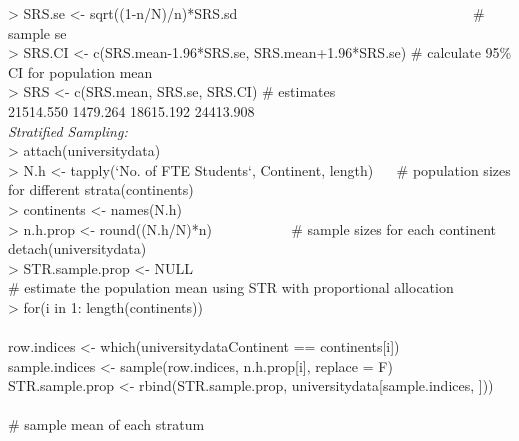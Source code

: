\documentclass{article}
\begin{document}
\textgreater\hspace{1mm} SRS.se \textless- sqrt((1-n/N)/n)*SRS.sd ~~~~~~~~~~~~~~~~~~~~~~~~~~~~~~~~~\# sample se\\
\textgreater\hspace{1mm} SRS.CI \textless- c(SRS.mean-1.96*SRS.se, SRS.mean+1.96*SRS.se) \# calculate 95\% CI for population mean\\
\textgreater\hspace{1mm} SRS \textless- c(SRS.mean, SRS.se, SRS.CI) \# estimates\\
\hspace{1mm} 21514.550  1479.264 18615.192 24413.908\\

\noindent\textit{Stratified Sampling:}\\
\textgreater\hspace{1mm} attach(universitydata)\\
\textgreater\hspace{1mm} N.h \textless- tapply(`No. of FTE Students`, Continent, length) ~~ \# population sizes for different strata(continents) \\
\textgreater\hspace{1mm} continents \textless- names(N.h)\\
\textgreater\hspace{1mm} n.h.prop \textless- round((N.h/N)*n) ~~~~~~~~~~ \# sample sizes for each continent\\
\texttgreater\hspace{1mm} detach(universitydata)\\
\textgreater\hspace{1mm} STR.sample.prop \textless- NULL\\
\hspace{1mm} \# estimate the population mean using STR with proportional allocation\\
\textgreater\hspace{1mm} for(i in 1: length(continents)) \\
\textbraceleft\\
row.indices \textless- which(universitydata\textdollar Continent == continents[i])\\
sample.indices \textless- sample(row.indices, n.h.prop[i], replace = F)\\
STR.sample.prop \textless- rbind(STR.sample.prop, universitydata[sample.indices, ]))\\
\textbraceright\\
\hspace{1mm} \# sample mean of each stratum\\
\end{document}
